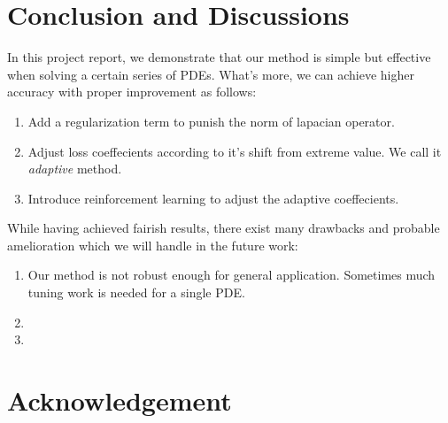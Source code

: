 \documentclass{article}
\begin{document}
\section{Conclusion and Discussions}

In this project report, we demonstrate that our method is simple but effective when solving a certain series of PDEs. What's more, we can achieve higher accuracy with proper improvement as follows:

\begin{enumerate}
\item
Add a regularization term to punish the norm of lapacian operator. 
\item
Adjust loss coeffecients according to it's shift from  extreme value. We call it \emph{adaptive} method.
\item
Introduce reinforcement learning to adjust the adaptive coeffecients.
\end{enumerate}

While having achieved fairish results, there exist many drawbacks and probable amelioration which we will handle in the future work:

\begin{enumerate}
\item
Our method is not robust enough for general application. Sometimes much tuning work is needed for a single PDE.
\item

\item

\end{enumerate}

\section*{Acknowledgement}





\medskip

\small
\end{document}
